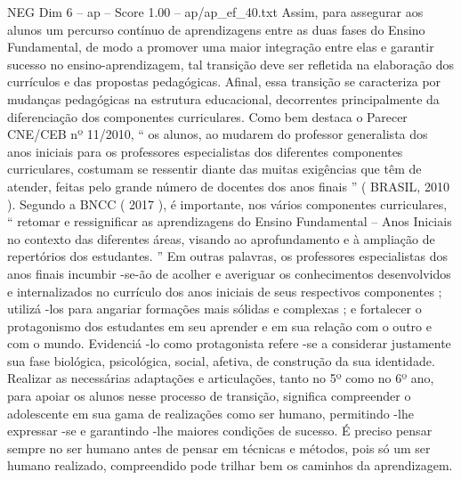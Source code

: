 \begin{textsample}{NEG Dim 6 – ap – Score 1.00 – ap/ap\_ef\_40.txt}
Assim, para assegurar aos alunos um percurso contínuo de aprendizagens entre as duas fases do Ensino Fundamental, de modo a promover uma maior integração entre elas e garantir sucesso no ensino-aprendizagem, tal transição deve ser refletida na elaboração dos currículos e das propostas pedagógicas.
Afinal, essa transição se caracteriza por mudanças pedagógicas na estrutura educacional, decorrentes principalmente da diferenciação dos componentes curriculares.
Como bem destaca o Parecer CNE/CEB nº 11/2010, “ os alunos, ao mudarem do professor generalista dos anos iniciais para os professores especialistas dos diferentes componentes curriculares, costumam se ressentir diante das muitas exigências que têm de atender, feitas pelo grande número de docentes dos anos finais ” ( BRASIL, 2010 ).
Segundo a BNCC ( 2017 ), é importante, nos vários componentes curriculares, “ retomar e ressignificar as aprendizagens do Ensino Fundamental – Anos Iniciais no contexto das diferentes áreas, visando ao aprofundamento e à ampliação de repertórios dos estudantes. ” Em outras palavras, os professores especialistas dos anos finais incumbir -se-ão de acolher e averiguar os conhecimentos desenvolvidos e internalizados no currículo dos anos iniciais de seus respectivos componentes ; utilizá -los para angariar formações mais sólidas e complexas ; e fortalecer o protagonismo dos estudantes em seu aprender e em sua relação com o outro e com o mundo.
Evidenciá -lo como protagonista refere -se a considerar justamente sua fase biológica, psicológica, social, afetiva, de construção da sua identidade.
Realizar as necessárias adaptações e articulações, tanto no 5º como no 6º ano, para apoiar os alunos nesse processo de transição, significa compreender o adolescente em sua gama de realizações como ser humano, permitindo -lhe expressar -se e garantindo -lhe maiores condições de sucesso.
É preciso pensar sempre no ser humano antes de pensar em técnicas e métodos, pois só um ser humano realizado, compreendido pode trilhar bem os caminhos da aprendizagem.

\end{textsample}
